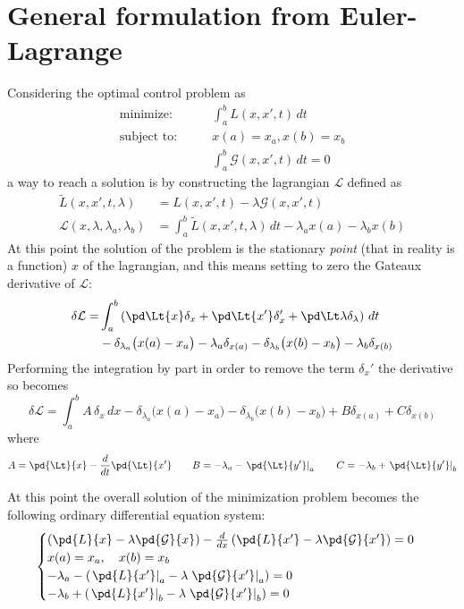 \section{General formulation from Euler-Lagrange}
	Considering the optimal control problem as
	\begin{equation} \begin{aligned}
		\textrm{minimize:} \qquad & \int_a^b  L (x,x',t)\, dt \\
		\textrm{subject to:}\qquad & x(a) = x_a, x(b) =x_b \\
		& \int_a^b \mathcal G(x,x',t)\,dt = 0
	\end{aligned} \end{equation}
	a way to reach a solution is by constructing the lagrangian $\mathcal L $ defined as
	\begin{equation}
	\begin{aligned}
		\tilde{ L }(x,x',t, \lambda) &  =  L (x,x',t) - \lambda \mathcal G(x,x',t) \\
		\mathcal L  (x,\lambda,\lambda_a,\lambda_b) & = \int_a^b \tilde{ L }(x,x',t,\lambda)\,dt - \lambda_a x(a) - \lambda_b x(b)
	\end{aligned}
	\end{equation}
	At this point the solution of the problem is the stationary \textit{point} (that in reality is a function) $x$ of the lagrangian, and this means setting to zero the Gateaux derivative of $\mathcal L $:
	\begin{align*}
		\delta \mathcal L  = &  \int_a^b \left( \pd \Lt{x} \delta_x + \pd \Lt {x'} \delta_x' + \pd \Lt \lambda \delta_\lambda \right)\, dt \\ & - \delta_{\lambda_a} \big(x(a)-x_a\big) - \lambda_a \delta_{x(a)} - \delta_{\lambda_b} \big(x(b)-x_b\big) - \lambda_b \delta_{x(b)}
	\end{align*}
	Performing the integration by part in order to remove the term $\delta_x'$ the derivative so becomes
	\[ \delta \mathcal L  = \int_a^b A\,\delta_x\, dx - \delta_{\lambda_a} \big(x(a)-x_a\big) - \delta_{\lambda_b}\big(x(b)-x_b\big) + B \delta_{x(a)} + C\delta_{x(b)} \]
	where
	\[ A = \pd{\Lt}{x} - \frac d{dt}\pd{\Lt}{x'} \qquad B = -\lambda_a  -\left.\pd{\Lt}{y'} \right|_a  \qquad C = -\lambda_b  + \left. \pd{\Lt}{y'} \right|_b \]
	
	At this point the overall solution of the minimization problem becomes the following ordinary differential equation system:
	\begin{equation}
	\begin{cases}
		\left(\pd{ L }{x} - \lambda \pd{\mathcal G}{x} \right) - \frac d{dx}
		\left(\pd{ L }{x'} - \lambda \pd{\mathcal G}{x'} \right) = 0 \\
		x(a) = x_a, \quad x(b) = x_b \\
		-\lambda_a - \left( \left.\pd{ L }{x'}\right|_a - \lambda \left. \pd{\mathcal G}{x'} \right|_a \right) = 0\\
		-\lambda_b + \left( \left.\pd{ L }{x'}\right|_b - \lambda \left. \pd{\mathcal G}{x'} \right|_b \right) = 0
	\end{cases}
	\end{equation}
	
